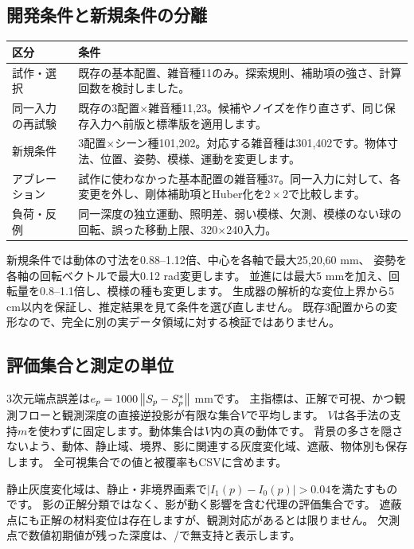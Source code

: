 \documentclass[a4paper,11pt]{ltjsarticle}
\theoremstyle{definition}
\begin{document}
\subsection{開発条件と新規条件の分離}
\begin{center}\small
\begin{tabularx}{\linewidth}{lX}\toprule 区分 & 条件\\\midrule
試作・選択 & 既存の基本配置、雑音種11のみ。探索規則、補助項の強さ、計算回数を検討しました。\\
同一入力の再試験 & 既存の3配置$\times$雑音種11,23。候補やノイズを作り直さず、同じ保存入力へ前版と標準版を適用します。\\
新規条件 & 3配置$\times$シーン種101,202。対応する雑音種は301,402です。物体寸法、位置、姿勢、模様、運動を変更します。\\
アブレーション & 試作に使わなかった基本配置の雑音種37。同一入力に対して、各変更を外し、剛体補助項とHuber化を$2\times2$で比較します。\\
負荷・反例 & 同一深度の独立運動、照明差、弱い模様、欠測、模様のない球の回転、誤った移動上限、320$\times$240入力。\\\bottomrule
\end{tabularx}\end{center}
新規条件では動体の寸法を0.88--1.12倍、中心を各軸で最大25,20,60 mm、
姿勢を各軸の回転ベクトルで最大0.12 rad変更します。
並進には最大5 mmを加え、回転量を0.8--1.1倍し、模様の種も変更します。
生成器の解析的な変位上界から5 cm以内を保証し、推定結果を見て条件を選び直しません。
既存3配置からの変形なので、完全に別の実データ領域に対する検証ではありません。

\subsection{評価集合と測定の単位}
3次元端点誤差は$e_p=1000\left\lVert S_p-S_p^*\right\rVert$ mmです。
主指標は、正解で可視、かつ観測フローと観測深度の直接逆投影が有限な集合$V$で平均します。
$V$は各手法の支持$m$を使わずに固定します。動体集合は$V$内の真の動体です。
背景の多さを隠さないよう、動体、静止域、境界、影に関連する灰度変化域、遮蔽、物体別も保存します。
全可視集合での値と被覆率もCSVに含めます。

静止灰度変化域は、静止・非境界画素で$|I_1(p)-I_0(p)|>0.04$を満たすものです。
影の正解分類ではなく、影が動く影響を含む代理の評価集合です。
遮蔽点にも正解の材料変位は存在しますが、観測対応があるとは限りません。
欠測点で数値初期値が残った深度は、/で無支持と表示します。
\end{document}
